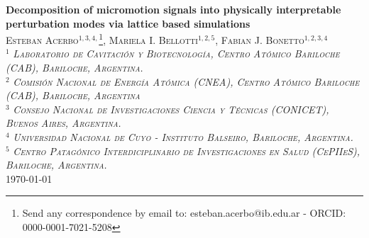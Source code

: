 \documentclass[english, 10pt, a4paper]{article}
\begin{document}
\begin{center}
 \centering
 {\LARGE\bfseries Decomposition of micromotion signals into physically interpretable perturbation modes via lattice based simulations}\\
 \textsc{Esteban Acerbo$^{1,3,4,}$\footnote[1]{Send any correspondence by email to: esteban.acerbo@ib.edu.ar - ORCID: 0000-0001-7021-5208}, Mariela I. Bellotti$^{1,2,5}$, Fabian J. Bonetto$^{1,2,3,4}$}\\
  \textsc{\small{$^1$ \textit{Laboratorio de Cavitación y Biotecnología, Centro Atómico Bariloche (CAB), Bariloche, Argentina.}\\$^2$ \textit{Comisión Nacional de Energía Atómica (CNEA), Centro Atómico Bariloche (CAB), Bariloche, Argentina}\\$^3$ \textit{Consejo Nacional de Investigaciones Ciencia y Técnicas (CONICET), Buenos Aires, Argentina.}\\$^4$ \textit{Universidad Nacional de Cuyo - Instituto Balseiro, Bariloche, Argentina.}}\\$^5$ \textit{Centro Patagónico Interdiciplinario de Investigaciones en Salud (CePIIeS), Bariloche, Argentina.}} \\[0.5cm]
 {\normalsize \today}\\[1cm]
\end{center}
 \begin{abstract}
  \noindent
Confluent cell monolayers over electrodes exhibit continuous impedance fluctuations that encode morphological and mechanical information at sub-second timescales, driven by lateral displacements, tight-junction remodeling, and biophysical parameter space heterogeneity. Decomposing these fluctuations into their constituent physical mechanisms remains an open problem, as each time step provides only two scalar observables while the underlying state space is high-dimensional. This work addresses the signal reconstruction through physically parameterized lattice-based simulation libraries built on a finite-difference model sharing the Giaever and Keese analytical model parametrization. Four perturbation libraries were computed, representing electrode-monolayer relative movement, subcellular tight-junction geometry modification, collective brick-wall rearrangement, and biophysical parameter microperturbations. Together, these libraries cover the experimental phase space for four physiological states: cell seeding, confluence, electrical wound healing, and post-healing confluence. Two reconstruction algorithms were evaluated: a greedy nearest-prototype method that assigns one mode per library per time step by sequentially minimizing the running residual, and a sparse Viterbi algorithm that enforces smooth state trajectories at the cost of fit quality. Both produce physically interpretable, model-consistent state sequences for each experimental electrode.
\end{abstract}
\end{document}
